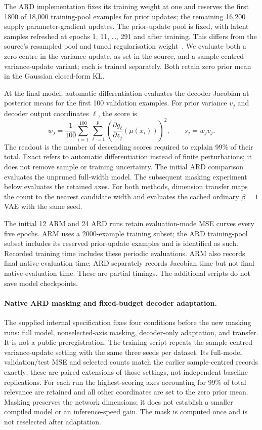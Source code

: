 \documentclass[make,article,submit,pdftex,moreauthors]{Definitions/mdpi}
\begin{document}
The ARD implementation fixes its training weight at one and reserves
the first 1800 of 18,000 training-pool examples for prior updates; the
remaining 16,200 supply parameter-gradient updates. The prior-update
pool is fixed, with latent samples refreshed at epochs 1, 11, \ldots,
291 and after training. This differs from the source's resampled pool
and tuned regularisation weight~\cite{saha2025ardvae}. We evaluate both
a zero centre in the variance update, as set in the source, and a
sample-centred variance-update variant; each is trained separately.
Both retain zero prior mean in the Gaussian closed-form KL.

At the final model, automatic differentiation evaluates the decoder
Jacobian at posterior means for the first 100 validation examples.
For prior variance $v_j$ and decoder output coordinates $\ell$, the score is
\begin{equation}
 w_j=\frac{1}{100}\sum_{i=1}^{100}\sum_{\ell=1}^{p}
 \left(\frac{\partial g_\ell}{\partial z_j}(\mu(x_i))\right)^2,
 \qquad s_j=w_jv_j.
 \label{eq:exactard}
\end{equation}
The readout is the number of descending scores required to explain
99\% of their total. Exact refers to automatic differentiation instead
of finite perturbations; it does not remove sample or training uncertainty.
The initial ARD comparison evaluates the unpruned full-width model.
The subsequent masking experiment below evaluates the retained axes.
For both methods,
dimension transfer maps the count to the nearest candidate width and
evaluates the cached ordinary $\beta=1$ VAE with the same seed.

The initial 12 ARM and 24 ARD runs retain evaluation-mode MSE curves every five epochs.
ARM uses a 2000-example training subset; the ARD training-pool subset
includes its reserved prior-update examples and is identified as such.
Recorded training time includes these periodic evaluations. ARM also
records final native-evaluation time; ARD separately records Jacobian
time but not final native-evaluation time. These are partial timings.
The additional scripts do not save model checkpoints.

\paragraph{Native ARD masking and fixed-budget decoder adaptation.}
The supplied internal specification fixes four conditions before the
new masking runs: full model, nonselected-axis masking, decoder-only
adaptation, and transfer. It is not a public preregistration.
The training script repeats the sample-centred variance-update setting
with the same three seeds per dataset. Its full-model validation/test
MSE and selected counts match the earlier sample-centred records exactly;
these are paired extensions of those settings, not independent baseline
replications. For each run the highest-scoring axes accounting for
99\% of total relevance are retained and
all other coordinates are set to the zero prior mean. Masking preserves
the network dimensions; it does not establish a smaller compiled model
or an inference-speed gain. The mask is computed once and is not
reselected after adaptation.
\end{document}
